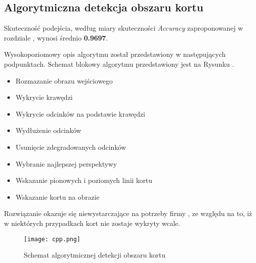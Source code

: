 \subsection{Algorytmiczna detekcja obszaru kortu}

Skuteczność podejścia, według miary skuteczności \textit{Accuracy} zaproponowanej w rozdziale , wynosi średnio \textbf{0.9697}.

Wysokopoziomowy opis algorytmu został przedstawiony w następujących podpunktach. Schemat blokowy algorytmu przedstawiony jest na Rysunku .

\begin{itemize}
  \item Rozmazanie obrazu wejściowego
  \item Wykrycie krawędzi
  \item Wykrycie odcinków na podstawie krawędzi
  \item Wydłużenie odcinków
  \item Usunięcie zdegradowanych odcinków
  \item Wybranie najlepszej perspektywy
  \item Wskazanie pionowych i poziomych linii kortu
  \item Wskazanie kortu na obrazie
\end{itemize}

Rozwiązanie okazuje się niewystarczające na potrzeby firmy \blue{}, ze względu na to, iż w niektórych przypadkach kort nie zostaje wykryty wcale.

\begin{figure}[h]
  \centering
  \caption{Schemat algorytmicznej detekcji obszaru kortu}
  \texttt{[image: cpp.png]}
  \label{fig:algcpp}
\end{figure}
